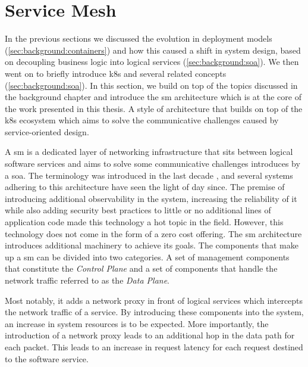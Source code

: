 \section{Service Mesh}
\label{sec:background:service-mesh}

In the previous sections we discussed the evolution in deployment models (\cref{sec:background:containers}) and how this caused a shift in system design, based on decoupling business logic into logical services (\cref{sec:background:soa}). We then went on to briefly introduce \gls{k8s} and several related concepts (\cref{sec:background:soa}). In this section, we build on top of the topics discussed in the background chapter and introduce the \gls{sm} architecture which is at the core of the work presented in this thesis. A style of architecture that builds on top of the \gls{k8s} ecosystem which aims to solve the communicative challenges caused by service-oriented design.





A \gls{sm} is a dedicated layer of networking infrastructure that sits between logical software services and aims to solve some communicative challenges introduces by a \gls{soa}. The terminology was introduced in the last decade \cite{service-mesh-hype}, and several systems adhering to this architecture have seen the light of day since. The premise of introducing additional observability in the system, increasing the reliability of it while also adding security best practices to little or no additional lines of application code made this technology a hot topic in the field. However, this technology does not come in the form of a zero cost offering. The \gls{sm} architecture introduces additional machinery to achieve its goals. The components that make up a \gls{sm} can be divided into two  categories. A set of management components that constitute the \textit{Control Plane} and a set of components that handle the network traffic referred to as the \textit{Data Plane}.


Most notably, it adds a network proxy in front of logical services which intercepts the network traffic of a service. By introducing these components into the system, an increase in system resources is to be expected. More importantly, the introduction of a network proxy leads to an additional hop in the data path for each packet. This leads to an increase in request latency for each request destined to the software service. 

